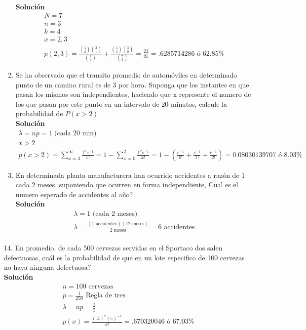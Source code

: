 \begin{enumerate}
    \\\textbf{Solución}
    \\
    \begin{gather*}
        N=7\\
        n=3\\
        k=4\\
        x=2, 3\\
        p(2, 3) = \frac{\binom{4}{2}\binom{3}{1}}{\binom{7}{3}} + \frac{\binom{4}{3}\binom{3}{0}}{\binom{7}{3}} = \frac{22}{35} =.6285714286 \text{ ó } 62.85\%
    \end{gather*}
	\item Se ha observado que el transito promedio de automóviles en determinado punto de un camino rural es de 3 por hora. Suponga que los instantes en que pasan los mismos son independientes, haciendo que x represente el numero de los que pasan por este punto en un intervalo de 20 minutos, calcule la probabilidad de $P(x > 2)$
    \\\textbf{Solución}
    \\
    \begin{gather*}
        \lambda = np = 1 \text{ (cada 20 min)}\\
        x>2\\
        p(x>2) =\sum _{x=3}^{\infty }\frac{{1}^{x}{e}^{-1}}{x!}=1 - \sum _{x=0}^{2}\frac{{1}^{x}{e}^{-1}}{x!} = 1- \left( \frac{{e}^{-1}}{0!}+\frac{{e}^{-1}}{1!}+\frac{{e}^{-1}}{2!} \right) = 0.08030139707 \text{ ó } 8.03\%
    \end{gather*}
	\item En determinada planta manufacturera han ocurrido accidentes a razón de 1 cada 2 meses. suponiendo que ocurren en forma independiente, Cual es el numero esperado de accidentes al año?
    \\\textbf{Solución}
    \\
    \begin{gather*}
        \lambda = 1 \text{ (cada 2 meses)}\\
        \lambda = \frac{(1 \text{ accidentes})(12 \text{ meses})}{2 \text{ meses}} = 6 \text{ accidentes}\\
    \end{gather*}
\end{enumerate}
14. En promedio, de cada 500 cervezas servidas en el Sportaco dos salen defectuosas, cuál es la probabilidad de que en un lote especifico de 100 cervezas no haya ninguna defectuosa?
\\\textbf{Solución}
\begin{gather*}
    n = 100 \text{ cervezas}\\
    p = \frac{1}{250} \text{ Regla de tres}\\
    \lambda = np = \frac{2}{5}\\
    p(x) = \frac{(.4)^{x}(e)^{-\lambda}}{x!}= .670320046 \text{ ó } 67.03\%\\
\end{gather*}
